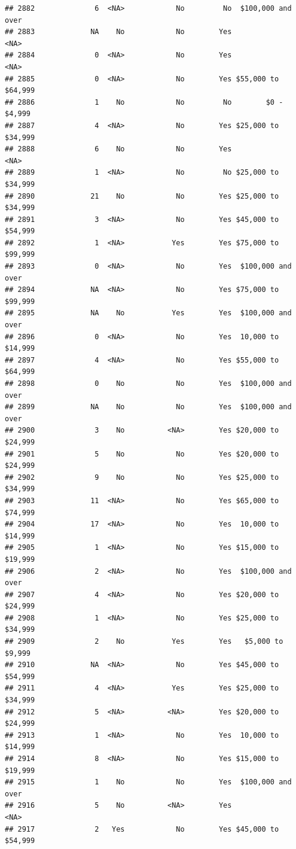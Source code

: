 \documentclass[man]{apa6}
\begin{document}
\begin{verbatim}
## 2882              6  <NA>            No         No  $100,000 and over
## 2883             NA    No            No        Yes               <NA>
## 2884              0  <NA>            No        Yes               <NA>
## 2885              0  <NA>            No        Yes $55,000 to $64,999
## 2886              1    No            No         No        $0 - $4,999
## 2887              4  <NA>            No        Yes $25,000 to $34,999
## 2888              6    No            No        Yes               <NA>
## 2889              1  <NA>            No         No $25,000 to $34,999
## 2890             21    No            No        Yes $25,000 to $34,999
## 2891              3  <NA>            No        Yes $45,000 to $54,999
## 2892              1  <NA>           Yes        Yes $75,000 to $99,999
## 2893              0  <NA>            No        Yes  $100,000 and over
## 2894             NA  <NA>            No        Yes $75,000 to $99,999
## 2895             NA    No           Yes        Yes  $100,000 and over
## 2896              0  <NA>            No        Yes  10,000 to $14,999
## 2897              4  <NA>            No        Yes $55,000 to $64,999
## 2898              0    No            No        Yes  $100,000 and over
## 2899             NA    No            No        Yes  $100,000 and over
## 2900              3    No          <NA>        Yes $20,000 to $24,999
## 2901              5    No            No        Yes $20,000 to $24,999
## 2902              9    No            No        Yes $25,000 to $34,999
## 2903             11  <NA>            No        Yes $65,000 to $74,999
## 2904             17  <NA>            No        Yes  10,000 to $14,999
## 2905              1  <NA>            No        Yes $15,000 to $19,999
## 2906              2  <NA>            No        Yes  $100,000 and over
## 2907              4  <NA>            No        Yes $20,000 to $24,999
## 2908              1  <NA>            No        Yes $25,000 to $34,999
## 2909              2    No           Yes        Yes   $5,000 to $9,999
## 2910             NA  <NA>            No        Yes $45,000 to $54,999
## 2911              4  <NA>           Yes        Yes $25,000 to $34,999
## 2912              5  <NA>          <NA>        Yes $20,000 to $24,999
## 2913              1  <NA>            No        Yes  10,000 to $14,999
## 2914              8  <NA>            No        Yes $15,000 to $19,999
## 2915              1    No            No        Yes  $100,000 and over
## 2916              5    No          <NA>        Yes               <NA>
## 2917              2   Yes            No        Yes $45,000 to $54,999

\end{verbatim}
\end{document}
